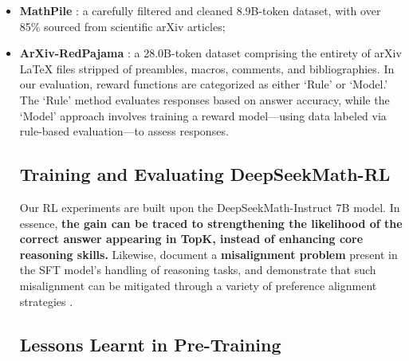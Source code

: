 \begin{itemize}[topsep=0pt]
\begin{itemize}[topsep=0pt]
    \item \textbf{MathPile} \citep{mathpile}: a carefully filtered and cleaned 8.9B-token dataset, with over 85\% sourced from scientific arXiv articles;
    \item \textbf{ArXiv-RedPajama} \citep{redpajama}: a 28.0B-token dataset comprising the entirety of arXiv LaTeX files stripped of preambles, macros, comments, and bibliographies. In our evaluation, reward functions are categorized as either `Rule' or `Model.' The `Rule' method evaluates responses based on answer accuracy, while the `Model' approach involves training a reward model—using data labeled via rule-based evaluation—to assess responses. \subsection{Training and Evaluating DeepSeekMath-RL}

Our RL experiments are built upon the DeepSeekMath-Instruct 7B model. In essence, \textbf{the gain can be traced to strengthening the likelihood of the correct answer appearing in TopK, instead of enhancing core reasoning skills.} Likewise, \citep{wang2023making} document a \textbf{misalignment problem} present in the SFT model’s handling of reasoning tasks, and demonstrate that such misalignment can be mitigated through a variety of preference alignment strategies \citep{yuan2023rrhf,song2023preference,wang2023making}. \subsection{Lessons Learnt in Pre-Training}


\end{itemize}
\end{itemize}
